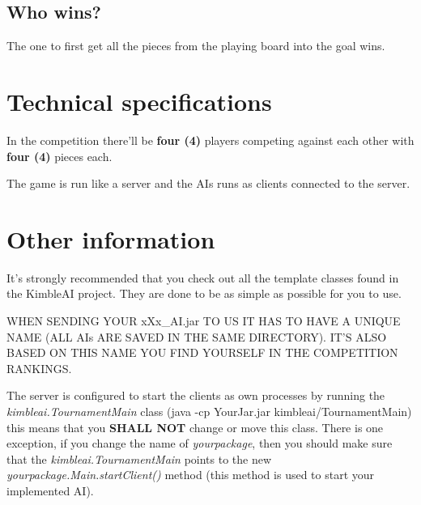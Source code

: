 \documentclass[10pt,a4paper]{article}
\begin{document}

\subsection{Who wins?}

The one to first get all the pieces from the playing board into the goal wins.


\section{Technical specifications}
\label{sec:tech-specs}


In the competition there'll be \textbf{four (4)} players competing against each other with \textbf{four (4)} pieces each.

The game is run like a server and the AIs runs as clients connected to the server.



\section{Other information}
\label{sec:other-info}


It's strongly recommended that you check out all the template classes found in the KimbleAI project. They are done to be as simple as possible for you to use.

\vspace{0.5cm}

WHEN SENDING YOUR xXx\_AI.jar TO US IT HAS TO HAVE A UNIQUE NAME (ALL AIs ARE SAVED IN THE SAME DIRECTORY). IT'S ALSO BASED ON THIS NAME YOU FIND YOURSELF IN THE COMPETITION RANKINGS.

\vspace{0.5cm}


The server is configured to start the clients as own processes by running the \textit{kimbleai.TournamentMain} class (java -cp YourJar.jar kimbleai/TournamentMain) this means that you \textbf{SHALL NOT} change or move this class. There is one exception, if you change the name of \textit{yourpackage}, then you should make sure that the \textit{kimbleai.TournamentMain} points to the new \textit{yourpackage.Main.startClient()} method (this method is used to start your implemented AI).
\end{document}
